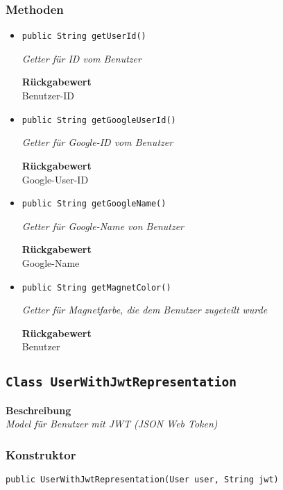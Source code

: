     \subsubsection*{Methoden}
    \begin{itemize}
    	\item{\texttt{public String getUserId()}}
    	
    	\textit{Getter für ID vom Benutzer}
    	
    	
    	
    	\textbf{Rückgabewert} \\
    	Benutzer-ID        \item{\texttt{public String getGoogleUserId()}}
    	
    	\textit{Getter für Google-ID vom Benutzer}
    	
    	
    	
    	\textbf{Rückgabewert} \\
    	Google-User-ID        \item{\texttt{public String getGoogleName()}}
    	
    	\textit{Getter für Google-Name von Benutzer}
    	
    	
    	
    	\textbf{Rückgabewert} \\
    	Google-Name        \item{\texttt{public String getMagnetColor()}}
    	
    	\textit{Getter für Magnetfarbe, die dem Benutzer zugeteilt wurde}
    	
    	
    	
    	\textbf{Rückgabewert} \\
    	Benutzer
    \end{itemize}
    \subsection{\texttt{Class UserWithJwtRepresentation}}
    \textbf{Beschreibung} \\
    \textit{Model für Benutzer mit JWT (JSON Web Token)}
    \subsubsection*{Konstruktor}
    \texttt{public UserWithJwtRepresentation(User user, String jwt)}
